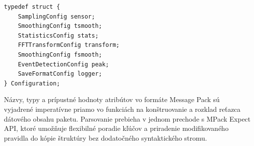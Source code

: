 \begin{lstlisting}[style=cstyle,label={config:struct},caption=Štruktúra systémovej konfigurácie,
morekeywords={Configuration}]
typedef struct {
    SamplingConfig sensor;
    SmoothingConfig tsmooth;
    StatisticsConfig stats;
    FFTTransformConfig transform;
    SmoothingConfig fsmooth;
    EventDetectionConfig peak;
    SaveFormatConfig logger;
} Configuration;
\end{lstlisting}

Názvy, typy a prípustné hodnoty atribútov vo formáte Message Pack sú vyjadrené imperatívne priamo vo funkciách
na konštruovanie a rozklad reťazca dátového obsahu paketu. Parsovanie prebieha v jednom prechode s MPack Expect API, 
ktoré umožňuje flexibilné poradie kľúčov a priradenie modifikovaného pravidla do kópie štruktúry bez dodatočného syntaktického stromu.
